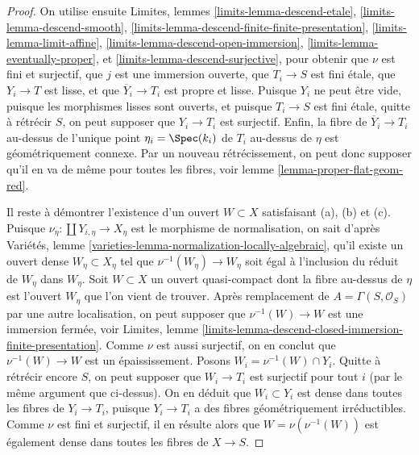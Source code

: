 \begin{proof}
On utilise ensuite Limites, lemmes \ref{limits-lemma-descend-etale},
\ref{limits-lemma-descend-smooth},
\ref{limits-lemma-descend-finite-finite-presentation},
\ref{limits-lemma-limit-affine},
\ref{limits-lemma-descend-open-immersion},
\ref{limits-lemma-eventually-proper}, et
\ref{limits-lemma-descend-surjective},
pour obtenir que $\nu$ est fini et surjectif, que $j$ est une immersion ouverte, que $T_i \to S$ est fini
\'etale, que $Y_i \to T$ est lisse, et que $\overline{Y}_i \to T_i$ est propre et
lisse. Puisque $Y_i$ ne peut être vide, puisque les morphismes lisses
sont ouverts, et puisque $T_i \to S$ est fini \'etale, quitte à rétrécir $S$,
on peut supposer que $Y_i \to T_i$ est surjectif. Enfin, la fibre de
$\overline{Y}_i \to T_i$ au-dessus de l'unique point $\eta_i = \Spec(k_i)$ 
de $T_i$ au-dessus de $\eta$ est géométriquement connexe.
Par un nouveau rétrécissement, on peut donc supposer qu'il en va de même
pour toutes les fibres, voir
lemme \ref{lemma-proper-flat-geom-red}.

\medskip\noindent
Il reste à démontrer l'existence d'un ouvert $W \subset X$
satisfaisant (a), (b) et (c). Puisque $\nu_\eta : \coprod Y_{i, \eta} \to X_\eta$
est le morphisme de normalisation, on sait d'après
Variétés, lemme \ref{varieties-lemma-normalization-locally-algebraic},
qu'il existe un ouvert dense $W_\eta \subset X_\eta$
tel que $\nu^{-1}(W_\eta) \to W_\eta$ soit égal à
l'inclusion du réduit de $W_\eta$ dans $W_\eta$.
Soit $W \subset X$ un ouvert quasi-compact dont la fibre
au-dessus de $\eta$ est l'ouvert $W_\eta$ que l'on vient de trouver.
Après remplacement de $A = \Gamma(S, \mathcal{O}_S)$
par une autre localisation, on peut supposer que $\nu^{-1}(W) \to W$
est une immersion fermée, voir Limites, lemme
\ref{limits-lemma-descend-closed-immersion-finite-presentation}.
Comme $\nu$ est aussi surjectif, on en conclut que
$\nu^{-1}(W) \to W$ est un épaississement.
Posons $W_i = \nu^{-1}(W) \cap Y_i$.
Quitte à rétrécir encore $S$, on peut supposer que $W_i \to T_i$ est
surjectif pour tout $i$ (par le même argument que ci-dessus).
On en déduit que $W_i \subset Y_i$
est dense dans toutes les fibres de $Y_i \to T_i$, puisque $Y_i \to T_i$ a des
fibres géométriquement irréductibles.
Comme $\nu$ est fini et surjectif, il en résulte alors
que $W = \nu(\nu^{-1}(W))$ est également dense dans toutes les fibres
de $X \to S$.
\end{proof}











